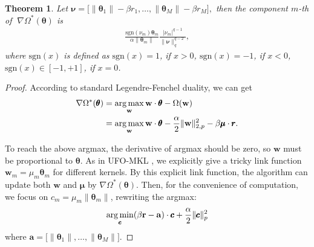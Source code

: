 \documentclass{article}
\newcommand{\argmax}{\operatornamewithlimits{arg\,max}}
\newcommand{\argmin}{\operatornamewithlimits{arg\,min}}
\newtheorem{theorem}{Theorem}
\begin{document}
 \begin{theorem}
\label{theorem-fenchel-dual}
Let
$
    \bm \nu=\Big[\|\pmb{\theta}_1\|-\beta r_1,\ldots,
    \|\pmb{\theta}_M\|-\beta r_M\Big],
$
then the component $m$-th of $\;\nabla\Omega^\ast(\pmb{\theta})$ is
\begin{align*}
\frac{\mathrm{sgn}(\nu_m) \pmb{\theta}_m}{\alpha\|\pmb{\theta}_m\|}
       \frac{|\nu_m|^{q-1}}{\|\bm \nu\|_q^{q-2}},
\end{align*}
where $\mathrm{sgn}(x)$ is defined as
$\mathrm{sgn}(x)=1$, if $x>0$, $\mathrm{sgn}(x)=-1$, if $x<0$,
$\mathrm{sgn}(x)\in[-1,+1]$, if $x=0$.
\end{theorem}

\begin{proof}
According to standard Legendre-Fenchel duality, we can get
\begin{align*}
\nabla\Omega^*(\pmb{\theta})&=\argmax\limits_{\mathbf w} \mathbf w \cdot \pmb{\theta} - \Omega(\mathbf w)\\
&=\argmax\limits_{\mathbf w} \mathbf w \cdot \pmb{\theta}
-\frac{\alpha}{2}\|\mathbf w\|_{2,p}^2
-\beta\pmb{\mu}\cdot\pmb{r}.
\end{align*}

To reach the above argmax, the derivative of argmax should be zero,
so $\mathbf w$ must be proportional to $\pmb{\theta}$.
As in UFO-MKL \cite{OrabonaL11}, we explicitly give a tricky link function
$\mathbf w_m=\mu_m\pmb{\theta}_m$ for different kernels.
By this explicit link function, the algorithm can update both $\mathbf w$ and $\pmb \mu$ by $\nabla\Omega^\ast(\pmb{\theta})$.
Then, for the convenience of computation, we focus on $c_m=\mu_m\|\pmb{\theta}_m\|$, rewriting the argmax:
\begin{align}
    \label{lp-regularization}
    \argmin \limits_{\pmb{c}} (\beta\mathbf{r} - \mathbf{a})\cdot\pmb{c}+\frac{\alpha}{2}\|\pmb{c}\|_p^2
\end{align}
where $\mathbf{a}=\Big[\|\pmb{\theta}_1\|,\ldots, \|\pmb{\theta}_M\|\Big]$.


\end{proof}
\end{document}
